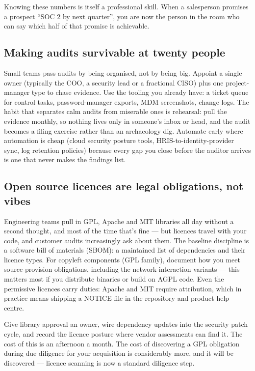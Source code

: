 Knowing these numbers is itself a professional skill. When a salesperson promises a prospect ``SOC 2 by next quarter'', you are now the person in the room who can say which half of that promise is achievable.



\subsection{Making audits survivable at twenty people}


Small teams pass audits by being organised, not by being big. Appoint a single owner (typically the COO, a security lead or a fractional CISO) plus one project-manager type to chase evidence. Use the tooling you already have: a ticket queue for control tasks, password-manager exports, MDM screenshots, change logs. The habit that separates calm audits from miserable ones is rehearsal: pull the evidence monthly, so nothing lives only in someone's inbox or head, and the audit becomes a filing exercise rather than an archaeology dig. Automate early where automation is cheap (cloud security posture tools, HRIS-to-identity-provider sync, log retention policies) because every gap you close before the auditor arrives is one that never makes the findings list.



\subsection{Open source licences are legal obligations, not vibes}


Engineering teams pull in GPL, Apache and MIT libraries all day without a second thought, and most of the time that's fine — but licences travel with your code, and customer audits increasingly ask about them. The baseline discipline is a software bill of materials (SBOM): a maintained list of dependencies and their licence types. For copyleft components (GPL family), document how you meet source-provision obligations, including the network-interaction variants — this matters most if you distribute binaries or build on AGPL code. Even the permissive licences carry duties: Apache and MIT require attribution, which in practice means shipping a NOTICE file in the repository and product help centre.


Give library approval an owner, wire dependency updates into the security patch cycle, and record the licence posture where vendor assessments can find it. The cost of this is an afternoon a month. The cost of discovering a GPL obligation during due diligence for your acquisition is considerably more, and it will be discovered — licence scanning is now a standard diligence step.



